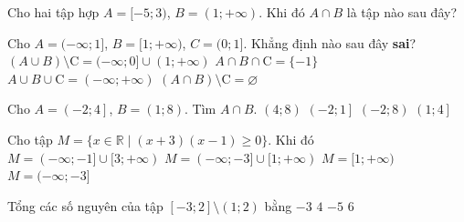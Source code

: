 

\begin{ex}%
	Cho hai tập hợp $A=[-5;3)$,  $B=(1;+\infty)$. Khi đó $A\cap B$ là tập nào sau đây?
	\choice  { $(1;3]$}{ $[-5;+\infty)$}{\True $(1;3)$}{ $[-5;1]$}
\end{ex}

\begin{ex}%
	 Cho $A=(-\infty; 1]$, $B=[1;+\infty)$, $C=(0; 1]$. Khẳng định nào sau đây \textbf{sai}?
	 \choice
		{$(A \cup B) \setminus  \mathrm{C}=(-\infty; 0] \cup(1;+\infty)$}
		{\True $A \cap B \cap  \mathrm{C}=\{-1\}$}
		{$A \cup B \cup \mathrm{C}=(-\infty;+\infty)$} 
		{$(A \cap B) \setminus  \mathrm{C}=\varnothing$}
\end{ex}

\begin{ex}%
	Cho $A=\left(-2;4\right]$, $B=\left(1;8\right)$. Tìm $A\cap  B$.
	\choice 
		 {$\left(4; 8\right)$}
		{$\left(-2;  1\right]$}
		{$\left(-2; 8\right)$} 
		 {\True $\left(1; 4\right]$}
	 \loigiai{
		 Ta có $A\cap B=\left(1; 4\right]$.
	 }
\end{ex}

\begin{ex}%
	Cho  tập $M=\{x \in \mathbb{R} \mid (x+3)(x-1) \geqslant 0\}$. Khi đó
	 \choice
		{$M=(-\infty;-1] \cup[3;+\infty)$} 
		{\True $M=(-\infty;-3] \cup[1;+\infty)$} 
		 {$M=[1;+\infty)$}
		 {$M=(-\infty;-3]$}
	\loigiai{ 
		Ta có $(x+3)(x-1)  \geqslant 0 \Leftrightarrow \hoac{& x \leqslant-3 \\& x \geqslant 1} $
		$\Rightarrow  M=(-\infty;-3] \cup [1;+\infty)$.
	 }
\end{ex}

\begin{ex}%
	Tổng các  số nguyên của tập $[-3;2]\setminus(1;2)$ bằng
	 \choice
		 {\True$-3$}
		 {$4$}
		 {$-5$}
		{$6$} 
\end{ex}

